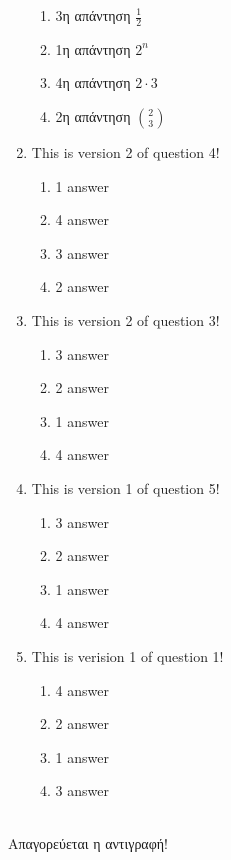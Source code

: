\documentclass[a4paper, 11pt]{article}
\begin{document}
\begin{enumerate}
\begin{enumerate}[(1)]
    \item 3η απάντηση $\frac{1}{2}$
    \item 1η απάντηση $2^n$
    \item 4η απάντηση $2\cdot 3$
    \item 2η απάντηση $\binom{2}{3}$
\end{enumerate}
\item This is version 2 of question 4!
\begin{enumerate}[(1)]
    \item 1 answer
    \item 4 answer
    \item 3 answer
    \item 2 answer
\end{enumerate}
\item This is version 2 of question 3!
\begin{enumerate}[(1)]
    \item 3 answer
    \item 2 answer
    \item 1 answer
    \item 4 answer
\end{enumerate}
\item This is version 1 of question 5!
\begin{enumerate}[(1)]
    \item 3 answer
    \item 2 answer
    \item 1 answer
    \item 4 answer
\end{enumerate}
\item This is verision 1 of question 1!
\begin{enumerate}[(1)]
    \item 4 answer
    \item 2 answer
    \item 1 answer
    \item 3 answer
\end{enumerate}
\end{enumerate}
\hrulefill \\ 

Απαγορεύεται η αντιγραφή! 

\newpage 
\end{document}
